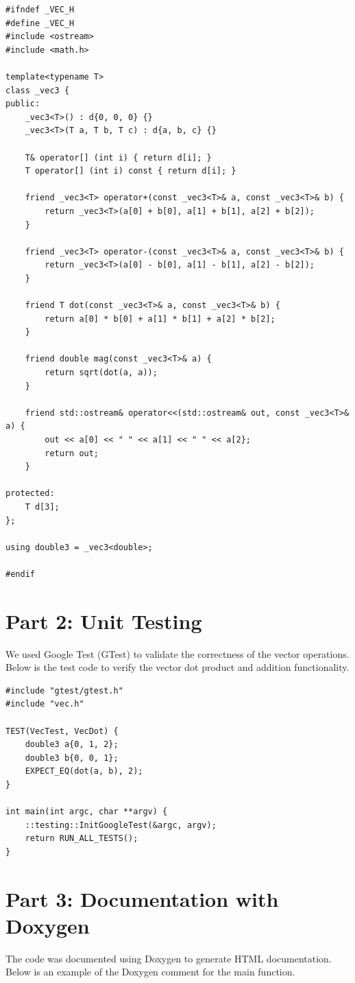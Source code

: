 \documentclass[
]{IEEEtran}
\begin{document}
\begin{lstlisting}[caption={C++ Vector Code}, label={lst:code}]
#ifndef _VEC_H
#define _VEC_H
#include <ostream>
#include <math.h>

template<typename T>
class _vec3 {
public:
    _vec3<T>() : d{0, 0, 0} {}
    _vec3<T>(T a, T b, T c) : d{a, b, c} {}
    
    T& operator[] (int i) { return d[i]; }
    T operator[] (int i) const { return d[i]; }

    friend _vec3<T> operator+(const _vec3<T>& a, const _vec3<T>& b) {
        return _vec3<T>(a[0] + b[0], a[1] + b[1], a[2] + b[2]);
    }

    friend _vec3<T> operator-(const _vec3<T>& a, const _vec3<T>& b) {
        return _vec3<T>(a[0] - b[0], a[1] - b[1], a[2] - b[2]);
    }

    friend T dot(const _vec3<T>& a, const _vec3<T>& b) {
        return a[0] * b[0] + a[1] * b[1] + a[2] * b[2];
    }

    friend double mag(const _vec3<T>& a) {
        return sqrt(dot(a, a));
    }

    friend std::ostream& operator<<(std::ostream& out, const _vec3<T>& a) {
        out << a[0] << " " << a[1] << " " << a[2}; 
        return out;
    }

protected:
    T d[3];
};

using double3 = _vec3<double>;

#endif
\end{lstlisting}

\section{Part 2: Unit Testing}
We used Google Test (GTest) to validate the correctness of the vector operations. Below is the test code to verify the vector dot product and addition functionality.

\begin{lstlisting}[caption={Unit Test Code with GTest}, label={lst:test}]
#include "gtest/gtest.h"
#include "vec.h"

TEST(VecTest, VecDot) {
    double3 a{0, 1, 2};
    double3 b{0, 0, 1};
    EXPECT_EQ(dot(a, b), 2);
}

int main(int argc, char **argv) {
    ::testing::InitGoogleTest(&argc, argv);
    return RUN_ALL_TESTS();
}
\end{lstlisting}

\section{Part 3: Documentation with Doxygen}
The code was documented using Doxygen to generate HTML documentation. Below is an example of the Doxygen comment for the main function.
\end{document}
